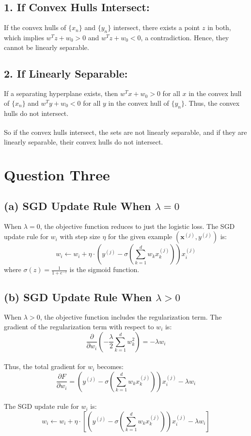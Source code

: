 \documentclass[a4paper, 11pt]{article}
\begin{document}
	\subsection*{1. If Convex Hulls Intersect:} 
	
	If the convex hulls of \( \{x_n\} \) and \( \{y_n\} \) intersect, there exists a point \( z \) in both, which implies \( w^T z + w_0 > 0 \) and \( w^T z + w_0 < 0 \), a contradiction. Hence, they cannot be linearly separable.
	
	\subsection*{2. If Linearly Separable:} If a separating hyperplane exists, then \( w^T x + w_0 > 0 \) for all \( x \) in the convex hull of \( \{x_n\} \) and \( w^T y + w_0 < 0 \) for all \( y \) in the convex hull of \( \{y_n\} \). Thus, the convex hulls do not intersect.
	\\\\
	So if the convex hulls intersect, the sets are not linearly separable, and if they are linearly separable, their convex hulls do not intersect.
	
	\newpage
	\section{Question Three}
	
	\subsection*{(a) SGD Update Rule When \(\lambda = 0\)}
	
	When \(\lambda = 0\), the objective function reduces to just the logistic loss. The SGD update rule for \(w_i\) with step size \(\eta\) for the given example \((\mathbf{x}^{(j)}, y^{(j)})\) is:
	\[
	w_i \leftarrow w_i + \eta \cdot \left( y^{(j)} - \sigma\left( \sum_{k=1}^d w_k x_k^{(j)} \right) \right) x_i^{(j)}
	\]
	where \(\sigma(z) = \frac{1}{1 + e^{-z}}\) is the sigmoid function.
	
	\subsection*{(b) SGD Update Rule When \(\lambda > 0\)}
	
	When \(\lambda > 0\), the objective function includes the regularization term. The gradient of the regularization term with respect to \(w_i\) is:
	\[
	\frac{\partial}{\partial w_i} \left( -\frac{\lambda}{2} \sum_{k=1}^d w_k^2 \right) = -\lambda w_i
	\]
	\\
	Thus, the total gradient for \(w_i\) becomes:
	\[
	\frac{\partial F}{\partial w_i} = \left( y^{(j)} - \sigma\left( \sum_{k=1}^d w_k x_k^{(j)} \right) \right) x_i^{(j)} - \lambda w_i
	\]
	\\
	The SGD update rule for \(w_i\) is:
	\[
	w_i \leftarrow w_i + \eta \cdot \left[ \left( y^{(j)} - \sigma\left( \sum_{k=1}^d w_k x_k^{(j)} \right) \right) x_i^{(j)} - \lambda w_i \right]
	\]
	
\end{document}
